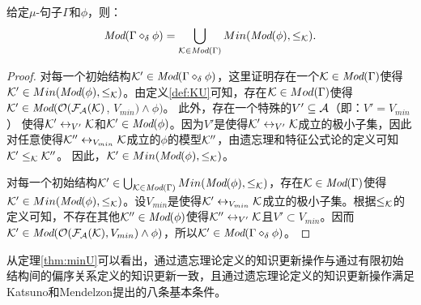 \begin{theorem}\label{thm:minU}
	给定$\mu$-句子$\Gamma$和$\phi$，则：
	\[\textit{Mod}(\Gamma \diamond_{\delta} \phi) = \bigcup_{{\cal K}\in \textit{Mod}(\Gamma)} Min(\textit{Mod}(\phi), \leq_{{\cal K}}).
	\]
\end{theorem}
\begin{proof}
	对每一个初始结构${\cal K}'\in \textit{Mod}(\Gamma \diamond_{\delta} \phi)$，这里证明存在一个${\cal K} \in \textit{Mod}(\Gamma)$使得${\cal K}' \in  Min(\textit{Mod}(\phi), \leq_{{\cal K}})$。由定义\ref{def:KU}可知，存在${\cal K}\in Mod(\Gamma)$使得${\cal K}'\in \textit{Mod}({\cal O}({\cal F}_{{\cal A}}({\cal K})$, $V_{min}) \wedge \phi)$。 此外，存在一个特殊的$V'\subseteq {\cal A}$（即：$V' = V_{min}$） 使得${\cal K}' \leftrightarrow_{V'} {\cal K}$和${\cal K}' \in \textit{Mod}(\phi)$。因为$V'$是使得${\cal K}' \leftrightarrow_{V'} {\cal K}$成立的极小子集，因此对任意使得${\cal K}'' \leftrightarrow_{V_{min}} {\cal K}$成立的$\phi$的模型${\cal K}''$，由遗忘理和特征公式论的定义可知${\cal K}' \leq_{{\cal K}} {\cal K}''$。 因此，${\cal K}' \in Min(\textit{Mod}(\phi), \leq_{{\cal K}})$。
	
	对每一个初始结构${\cal K}'\in \bigcup_{{\cal K}\in \textit{Mod}(\Gamma)} Min(\textit{Mod}(\phi), \leq_{{\cal K}})$，存在${\cal K} \in \textit{Mod}(\Gamma)$使得${\cal K}' \in  Min(\textit{Mod}(\phi), \leq_{{\cal K}})$。设$V_{min}$是使得${\cal K}' \leftrightarrow_{V_{min}} {\cal K}$成立的极小子集。根据$\leq_{{\cal K}}$的定义可知，不存在其他${\cal K}''\in \textit{Mod}(\phi)$使得${\cal K}'' \leftrightarrow_{V'} {\cal K}$且$V' \subset V_{min}$。因而${\cal K}' \in \textit{Mod}({\cal O}({\cal F}_{{\cal A}}({\cal K}), V_{min}) \wedge \phi)$，所以${\cal K}' \in \textit{Mod}(\Gamma \diamond_{\delta} \phi)$。
\end{proof}

从定理\ref{thm:minU}可以看出，通过遗忘理论定义的知识更新操作与通过有限初始结构间的偏序关系定义的知识更新一致，且通过遗忘理论定义的知识更新操作满足Katsuno和Mendelzon提出的八条基本条件。

